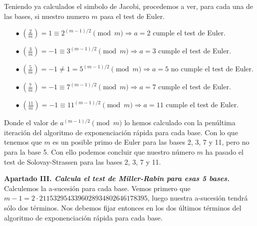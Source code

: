\documentclass[fleqn]{article}
\begin{document}
    Teniendo ya calculados el simbolo de Jacobi, procedemos a ver, para cada una de las bases, si nuestro numero $m$ pasa el test de Euler.
    \begin{enumerate}
        \item[$\bullet$] $\left(\frac{2}{m}\right) = 1 \equiv 2^{(m-1)/2} \pmod{m} \Rightarrow a = 2 $ cumple el test de Euler.
        \item[$\bullet$] $\left(\frac{3}{m}\right) = -1 \equiv 3^{(m-1)/2} \pmod{m} \Rightarrow a = 3 $ cumple el test de Euler.
        \item[$\bullet$] $\left(\frac{5}{m}\right) = -1 \neq 1 = 5^{(m-1)/2} \pmod{m} \Rightarrow a = 5 $ no cumple el test de Euler.
        \item[$\bullet$] $\left(\frac{7}{m}\right) = -1 \equiv 7^{(m-1)/2} \pmod{m} \Rightarrow a = 7 $ cumple el test de Euler.
        \item[$\bullet$] $\left(\frac{11}{m}\right) = -1 \equiv 11^{(m-1)/2} \pmod{m} \Rightarrow a = 11 $ cumple el test de Euler.
    \end{enumerate}

    Donde el valor de $a^{(m-1)/2} \pmod{m}$ lo hemos calculado con la penúltima iteración del algoritmo de exponenciación rápida para cada base.
    Con lo que tenemos que $m$ es un posible primo de Euler para las bases 2, 3, 7 y 11, pero no para la base 5.
    Con ello podemos concluir que nuestro número $m$ ha pasado el test de Solovay-Strassen para las bases 2, 3, 7 y 11.



    \newpage
    \textbf{Apartado III. \textit{Calcula el test de Miller-Rabin para esas 5 bases.}}
    Calculemos la a-sucesión para cada base. Vemos primero que $m-1 = 2 \cdot 2115329543396028934802646178395$, luego nuestra
    a-sucesión tendrá sólo dos términos. Nos debemos fijar entonces en los dos últimos términos del algoritmo de exponenciación 
    rápida para cada base.\\
\end{document}
